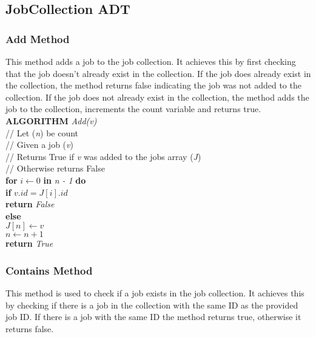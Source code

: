 \documentclass[12pt,a4paper]{article}
\begin{document}
		\newpage
			
		\subsection{JobCollection ADT}
			\subsubsection{Add Method}
				This method adds a job to the job collection. It achieves this by first checking that the job 
				doesn't already exist in the collection. If the job does already exist in the collection, the 
				method returns false indicating the job was not added to the collection. If the job does not 
				already exist in the collection, the method adds the job to the collection, increments the count 
				variable and returns true.\\
				
				\textbf{ALGORITHM} \textit{Add(v)}\\
				\null\hspace{1cm}// Let (\textit{n}) be count\\
				\null\hspace{1cm}// Given a job (\textit{v})\\
				\null\hspace{1cm}// Returns True if \textit{v} was added to the jobs array (\textit{J})\\
				\null\hspace{1cm}// Otherwise returns False\\
				\null\hspace{1cm}\textbf{for} \textit{$i \gets 0$} \textbf{in} \textit{n - 1} \textbf{do}\\
				\null\hspace{2cm}\textbf{if} \textit{$v.id = J[i].id$}\\
				\null\hspace{3cm}\textbf{return} \textit{False}\\
				\null\hspace{1cm}\textbf{else}\\
				\null\hspace{2cm}\textit{$J[n] \gets v$}\\
				\null\hspace{2cm}\textit{$n \gets n + 1$}\\
				\null\hspace{2cm}\textbf{return} \textit{True}\\

			\subsubsection{Contains Method}
				This method is used to check if a job exists in the job collection. It achieves this by 
				checking if there is a job in the collection with the same ID as the provided job ID. If there is 
				a job with the same ID the method returns true, otherwise it returns false.\\
\end{document}
